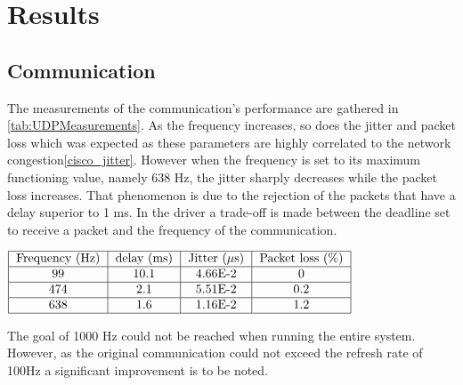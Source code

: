 \section{Results}

\subsection{Communication}

The measurements of the communication's performance are gathered in \ref{tab:UDPMeasurements}. As the frequency increases, so does  the jitter and packet loss which was expected as these parameters are highly correlated to the network congestion\ref{cisco_jitter}. However when the frequency is set to its maximum functioning value, namely 638 Hz, the jitter sharply decreases while the packet loss increases. That phenomenon is due to the rejection of the packets that have a delay superior to 1 ms. In the driver a trade-off is made between the deadline set to receive a packet and the frequency of the communication. 
\begin{center}
  $\begin{tabular}{|c|c|c|c|c|c|}
    \hline
    \text{Frequency (Hz)} & \text{delay (ms)} & \text{Jitter ($\mu$s)} & \text{Packet loss (\%)}\\
    \hline
    99 & 10.1 & 4.66E-2 & 0 \\
    \hline
    474 & 2.1 & 5.51E-2 & 0.2 \\
    \hline
    638 & 1.6 & 1.16E-2 & 1.2 \\
    \hline
  \end{tabular}$
  \label{tab:UDPMeasurements}
\end{center}
The goal of 1000 Hz could not be reached when running the entire system. However, as the original communication could not exceed the refresh rate of 100Hz a significant improvement is to be noted.

